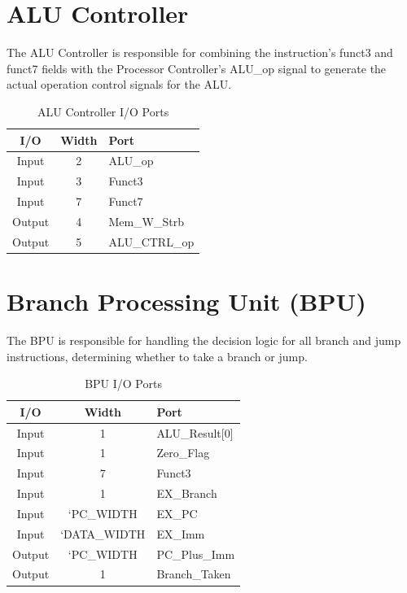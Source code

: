 \documentclass[12pt,a4paper]{report}
\begin{document}
\section{ALU Controller}

The ALU Controller is responsible for combining the instruction's funct3 and funct7 fields with the Processor Controller's ALU\_op signal to generate the actual operation control signals for the ALU.

\begin{table}[htbp]
\centering
\caption{ALU Controller I/O Ports}
\begin{tabular}{|c|c|l|}
\hline
\textbf{I/O} & \textbf{Width} & \textbf{Port} \\
\hline
Input & 2 & ALU\_op \\
Input & 3 & Funct3 \\
Input & 7 & Funct7 \\
Output & 4 & Mem\_W\_Strb \\
Output & 5 & ALU\_CTRL\_op \\
\hline
\end{tabular}
\end{table}

\section{Branch Processing Unit (BPU)}

The BPU is responsible for handling the decision logic for all branch and jump instructions, determining whether to take a branch or jump.

\begin{table}[htbp]
\centering
\caption{BPU I/O Ports}
\begin{tabular}{|c|c|l|}
\hline
\textbf{I/O} & \textbf{Width} & \textbf{Port} \\
\hline
Input & 1 & ALU\_Result[0] \\
Input & 1 & Zero\_Flag \\
Input & 7 & Funct3 \\
Input & 1 & EX\_Branch \\
Input & `PC\_WIDTH & EX\_PC \\
Input & `DATA\_WIDTH & EX\_Imm \\
Output & `PC\_WIDTH & PC\_Plus\_Imm \\
Output & 1 & Branch\_Taken \\
\hline
\end{tabular}
\end{table}
\end{document}

